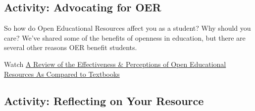 \documentclass[
]{book}
\theoremstyle{definition}
\theoremstyle{definition}
\theoremstyle{definition}
\theoremstyle{definition}
\theoremstyle{remark}
\begin{document}
\hypertarget{activity-advocating-for-oer}{%
\subsection*{Activity: Advocating for OER}\label{activity-advocating-for-oer}}

\begin{reflect}
So how do Open Educational Resources affect you as a student? Why should you care? We've shared some of the benefits of openness in education, but there are several other reasons OER benefit students.

Watch \href{https://www.youtube.com/watch?v=SX0K0hb_xKE}{A Review of the Effectiveness \& Perceptions of Open Educational Resources As Compared to Textbooks}
\end{reflect}

\hypertarget{activity-reflecting-on-your-resource}{%
\subsection*{Activity: Reflecting on Your Resource}\label{activity-reflecting-on-your-resource}}
\end{document}

